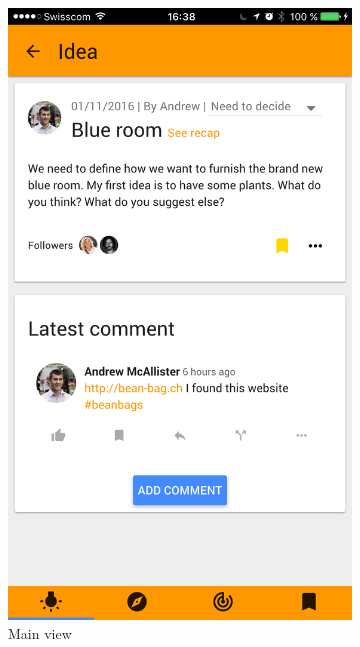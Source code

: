 \documentclass[a4paper,12pt, oneside]{article}
\begin{document}
\begin{figure}[!htb]
    \begin{subfigure}[t]{.32\textwidth}
        \includegraphics[width=\textwidth]{images/idea.png}
        \caption{Main view}
        \label{fig.idea.main}
    \end{subfigure}
    \hfill
    \begin{subfigure}[t]{.32\textwidth}

\end{subfigure}
\end{figure}
\end{document}

